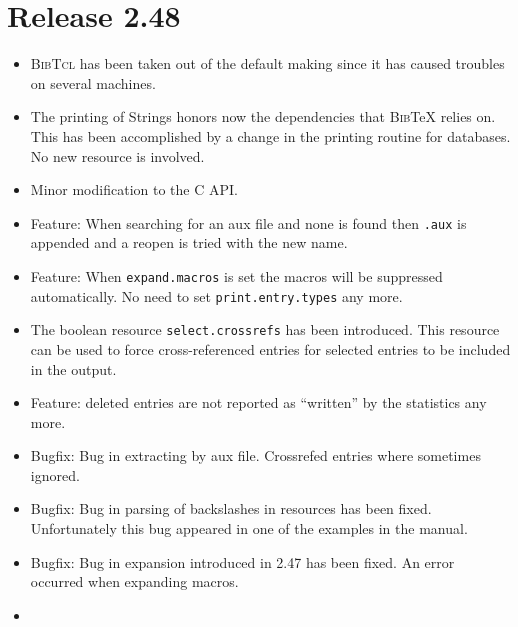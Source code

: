 \documentclass[11pt,a4paper]{scrartcl}
\newcommand\rsc[1]{\texttt{#1}}
\newcommand\BibTcl{\textsc{BibTcl}}
\newcommand\BibTeX{\textsc{Bib}\TeX}
\newenvironment{Release}[2]{\section*{Release #1}\begin{itemize}}{\end{itemize}}
\newenvironment{Fix}[1]{\item }{}
\newenvironment{New}[1]{\item }{}
\newenvironment{Update}[1]{\item }{}
\begin{document}
\begin{Release}{2.48}{August 6, 2004}
   \begin{Update}{gene}
     \BibTcl{} has been taken out of the default making since it has
     caused troubles on several machines.
   \end{Update}
   \begin{Update}{gene}
     The printing of Strings honors now the dependencies that
     \BibTeX{} relies on. This has been accomplished by a change in
     the printing routine for databases. No new resource is involved.
   \end{Update}
   \begin{Update}{gene}
     Minor modification to the C API.
   \end{Update}
  \begin{New}{gene}
    Feature: When searching for an aux file and none is found then
    \texttt{.aux} is appended and a reopen is tried with the new name.
  \end{New}
  \begin{Update}{gene}
    Feature: When \rsc{expand.macros} is set the macros will be
    suppressed automatically. No need to set \rsc{print.entry.types}
    any more.
  \end{Update}
  \begin{New}{gene}
    The boolean resource \rsc{select.crossrefs} has been introduced.
    This resource can be used to force cross-referenced entries for
    selected entries to be included in the output.
  \end{New}
  \begin{Update}{gene}
    Feature: deleted entries are not reported as "`written"' by the
    statistics any more.
  \end{Update}
  \begin{Fix}{gene}
    Bugfix: Bug in extracting by aux file. Crossrefed entries where
    sometimes ignored.
  \end{Fix}
  \begin{Fix}{gene}
    Bugfix: Bug in parsing of backslashes in resources has been fixed.
    Unfortunately this bug appeared in one of the examples in the manual.
  \end{Fix}
  \begin{Fix}{gene}
    Bugfix: Bug in expansion introduced in 2.47 has been fixed. An error
    occurred when expanding macros.
  \end{Fix}
  \begin{New}{gene}

\end{New}
\end{Release}
\end{document}
